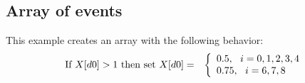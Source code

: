 

\subsection{Array of events}

This example creates an \Event array with the following behavior:
\begin{eqnarray*}
\textup{If }X[d0] > 1\textup{ then set }X[d0] & = & \left\{ \begin{array}{l}
0.5,~~i = 0, 1, 2, 3, 4 \\
0.75,~~i = 6, 7, 8
\end{array}
\right.
\end{eqnarray*}

